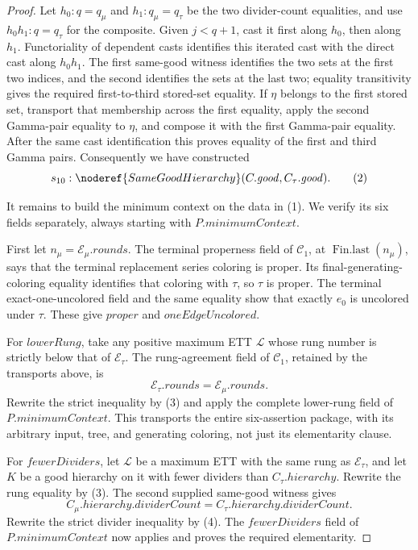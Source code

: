 \begin{proof}
Let \(h_0:q=q_\mu\) and \(h_1:q_\mu=q_\tau\) be the two divider-count
equalities, and use \(h_0h_1:q=q_\tau\) for the composite.  Given
\(j<q+1\), cast it first along \(h_0\), then along \(h_1\).  Functoriality
of dependent casts identifies this iterated cast with the direct cast
along \(h_0h_1\).  The first same-good witness identifies the two
 sets at the first two indices, and the
second identifies the sets at the last two; equality transitivity gives
the required first-to-third stored-set equality.  If
\(\eta\) belongs to the first stored set, transport that membership across
the first equality, apply the second Gamma-pair equality to \(\eta\), and
compose it with the first Gamma-pair equality.  After the same cast
identification this proves equality of the first and third Gamma pairs.
Consequently we have constructed
\[
 s_{10}:\noderef{SameGoodHierarchy}
       (C.\mathit{good},C_\tau.\mathit{good}).                 \tag{2}
\]

It remains to build the minimum context on the data in (1).  We verify its
six fields separately, always starting with
\(P.\mathit{minimumContext}\).

First let \(n_\mu=\mathcal E_\mu.\mathit{rounds}\).  The terminal
properness field of \(\mathcal C_1\), at
\(\operatorname{Fin.last}(n_\mu)\), says that the terminal replacement
series coloring is proper.  Its final-generating-coloring equality
identifies that coloring with \(\tau\), so \(\tau\) is proper.  The
terminal exact-one-uncolored field and the same equality show that exactly
\(e_0\) is uncolored under \(\tau\).  These give
\(\mathit{proper}\) and \(\mathit{oneEdgeUncolored}\).

For \(\mathit{lowerRung}\), take any positive maximum ETT \(\mathcal L\)
whose rung number is strictly below that of \(\mathcal E_\tau\).  The
rung-agreement field of \(\mathcal C_1\), retained by the transports
above, is
\[
 \mathcal E_\tau.\mathit{rounds}
   =\mathcal E_\mu.\mathit{rounds}.                            \tag{3}
\]
Rewrite the strict inequality by (3) and apply the complete lower-rung
field of \(P.\mathit{minimumContext}\).  This transports the entire
six-assertion package, with its arbitrary input, tree, and generating
coloring, not just its elementarity clause.

For \(\mathit{fewerDividers}\), let \(\mathcal L\) be a maximum ETT with
the same rung as \(\mathcal E_\tau\), and let \(K\) be a good hierarchy
on it with fewer dividers than
\(C_\tau.\mathit{hierarchy}\).  Rewrite the rung equality by (3).  The
second supplied same-good witness gives
\[
 C_\mu.\mathit{hierarchy}.\mathit{dividerCount}
 =C_\tau.\mathit{hierarchy}.\mathit{dividerCount}.             \tag{4}
\]
Rewrite the strict divider inequality by (4).  The
\(\mathit{fewerDividers}\) field of \(P.\mathit{minimumContext}\) now
applies and proves the required elementarity.


\end{proof}
